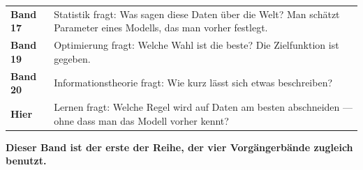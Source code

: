 \begin{merksatz}
\begin{center}
{\small
\renewcommand{\arraystretch}{1.5}
\begin{tabular}{@{}P{2.2cm}P{6.4cm}@{}}
\toprule
\textbf{Band 17} & Statistik fragt: Was sagen diese Daten über die Welt? Man schätzt Parameter eines Modells, das man vorher festlegt.\\
\textbf{Band 19} & Optimierung fragt: Welche Wahl ist die beste? Die Zielfunktion ist gegeben.\\
\textbf{Band 20} & Informationstheorie fragt: Wie kurz lässt sich etwas beschreiben?\\
\textbf{Hier} & Lernen fragt: Welche Regel wird auf  Daten am besten abschneiden --- ohne dass man das Modell vorher kennt?\\
\bottomrule
\end{tabular}}
\end{center}

\begin{center}
\begin{minipage}{0.9\textwidth}
\textbf{Dieser Band ist der erste der Reihe, der vier Vorgängerbände zugleich benutzt.}
\end{minipage}
\end{center}

\begin{center}
\begin{minipage}{0.88\textwidth}
\end{minipage}
\end{center}
\end{merksatz}


